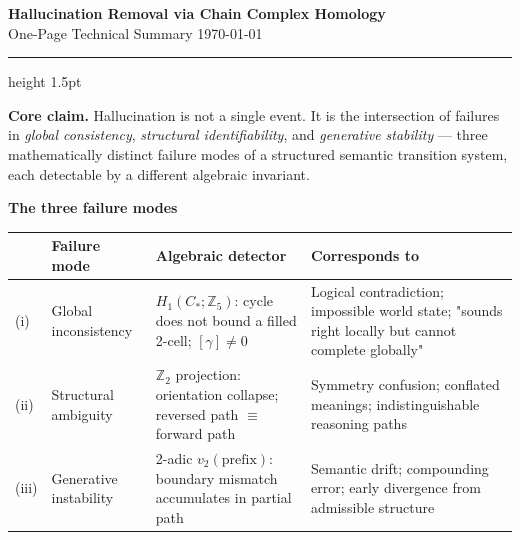 \documentclass[11pt,a4paper]{article}
\begin{document}
\thispagestyle{empty}

{\Large\bfseries\color{dark}
  Hallucination Removal via Chain Complex Homology\\[4pt]}
{\large\color{accent} One-Page Technical Summary}
\hfill{\small\color{gray} \today}
\vspace{2pt}
\hrule height 1.5pt
\vspace{14pt}

\noindent
\colorbox{soft}{\parbox{\dimexpr\linewidth-2\fboxsep}{%
\vspace{6pt}
\textbf{Core claim.}
Hallucination is not a single event.
It is the intersection of failures in \emph{global consistency},
\emph{structural identifiability}, and \emph{generative stability} ---
three mathematically distinct failure modes of a structured semantic
transition system, each detectable by a different algebraic invariant.
\vspace{6pt}}}

\vspace{12pt}

\noindent\textbf{The three failure modes}
\vspace{6pt}

\begin{tabular}{p{0.5cm}p{3.2cm}p{4.5cm}p{5.0cm}}
\toprule
& \textbf{Failure mode} & \textbf{Algebraic detector} & \textbf{Corresponds to} \\
\midrule
(i) &
  Global inconsistency &
  $H_1(C_*;\mathbb{Z}_5)$:
  cycle does not bound a filled 2-cell;
  $[\gamma]\neq 0$ &
  Logical contradiction; impossible world state;
  "sounds right locally but cannot complete globally" \\[6pt]
(ii) &
  Structural ambiguity &
  $\mathbb{Z}_2$ projection:
  orientation collapse;
  reversed path $\equiv$ forward path &
  Symmetry confusion; conflated meanings;
  indistinguishable reasoning paths \\[6pt]
(iii) &
  Generative instability &
  2-adic $v_2(\text{prefix})$:
  boundary mismatch accumulates in partial path &
  Semantic drift; compounding error;
  early divergence from admissible structure \\
\bottomrule
\end{tabular}

\vspace{10pt}
\end{document}
